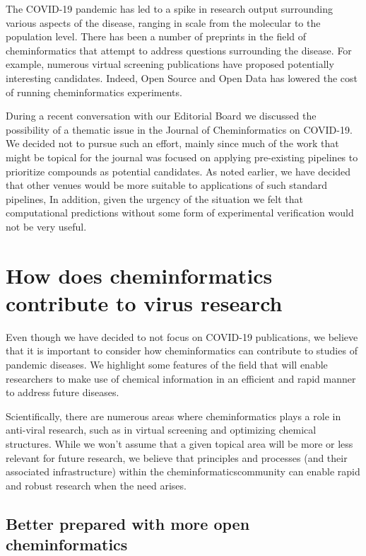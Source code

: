 \documentclass{bmcart}
\begin{document}


The COVID-19 pandemic has led to a spike in research output
surrounding various aspects of the disease, ranging in scale from the
molecular to the population level.  There has been a
number of preprints in the field of cheminformatics that attempt to
address questions surrounding the disease. For example, numerous
virtual screening publications have proposed potentially interesting
candidates. Indeed, Open Source and Open Data has lowered the cost of
running cheminformatics experiments.

During a recent conversation with our Editorial Board we discussed the
possibility of a thematic issue in the Journal of Cheminformatics on
COVID-19. We decided not to pursue such an effort, mainly since much
of the work that might be topical for the journal was focused on
applying pre-existing pipelines to prioritize compounds as potential
candidates. As noted earlier, we have decided that other venues would
be more suitable to applications of such standard pipelines, In
addition, given the urgency of the situation we felt that
computational predictions without some form of experimental
verification would not be very useful.

\section*{How does cheminformatics contribute to virus research}

Even though we have decided to not focus on COVID-19 publications, we
believe that it is important to consider how cheminformatics can 
contribute to studies of pandemic diseases. We
highlight some features of the field that will enable researchers to
make use of chemical information in an efficient and rapid manner to
address future diseases.


Scientifically, there are numerous areas where cheminformatics plays a
role in anti-viral research, such as in virtual screening and
optimizing chemical structures. While we won't assume that a given
topical area will be more or less relevant for future research, we
believe that principles and processes (and their associated
infrastructure) within the cheminformaticscommunity can enable rapid
and robust research when the need arises.

\subsection*{Better prepared with more open cheminformatics}
\end{document}
